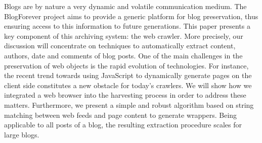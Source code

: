 Blogs are by nature a very dynamic and volatile communication medium. The BlogForever project aims to provide a generic platform for blog preservation, thus ensuring access to this information to future generations. This paper presents a key component of this archiving system: the web crawler. More precisely, our discussion will concentrate on techniques to automatically extract content, authors, date and comments of blog posts. One of the main challenges in the preservation of web objects is the rapid evolution of technologies. For instance, the recent trend towards using JavaScript to dynamically generate pages on the client side constitutes a new obstacle for today's crawlers. We will show how we integrated a web browser into the harvesting process in order to address these matters. Furthermore, we present a simple and robust algorithm based on string matching between web feeds and page content to generate wrappers. Being applicable to all posts of a blog, the resulting extraction procedure scales for large blogs.
